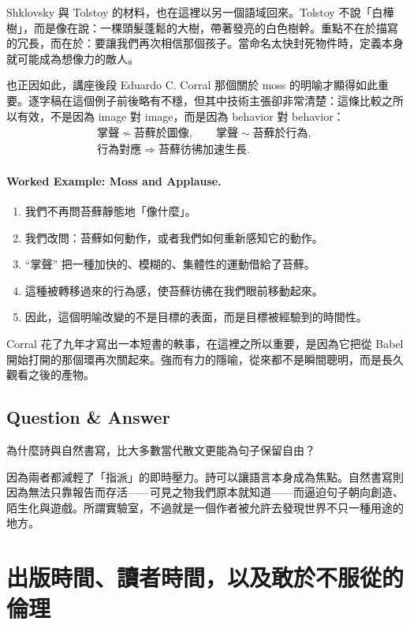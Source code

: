 Shklovsky 與 Tolstoy 的材料，也在這裡以另一個語域回來。Tolstoy 不說「白樺樹」，而是像在說：一棵頭髮蓬鬆的大樹，帶著發亮的白色樹幹。重點不在於描寫的冗長，而在於：要讓我們再次相信那個孩子。當命名太快封死物件時，定義本身就可能成為想像力的敵人。

也正因如此，講座後段 Eduardo C. Corral 那個關於 moss 的明喻才顯得如此重要。逐字稿在這個例子前後略有不穩，但其中技術主張卻非常清楚：這條比較之所以有效，不是因為 image 對 image，而是因為 behavior 對 behavior：
\begin{align}
\text{掌聲} \not\sim \text{苔蘚於圖像}, \qquad \text{掌聲} \sim \text{苔蘚於行為},\\
\text{行為對應} \Longrightarrow \text{苔蘚彷彿加速生長}.
\end{align}

\paragraph{Worked Example: Moss and Applause.}
\begin{enumerate}
\item 我們不再問苔蘚靜態地「像什麼」。
\item 我們改問：苔蘚如何動作，或者我們如何重新感知它的動作。
\item ``掌聲'' 把一種加快的、模糊的、集體性的運動借給了苔蘚。
\item 這種被轉移過來的行為感，使苔蘚彷彿在我們眼前移動起來。
\item 因此，這個明喻改變的不是目標的表面，而是目標被經驗到的時間性。
\end{enumerate}

Corral 花了九年才寫出一本短書的軼事，在這裡之所以重要，是因為它把從 Babel 開始打開的那個環再次關起來。強而有力的隱喻，從來都不是瞬間聰明，而是長久觀看之後的產物。

\subsection{Question \& Answer}

為什麼詩與自然書寫，比大多數當代散文更能為句子保留自由？

因為兩者都減輕了「指派」的即時壓力。詩可以讓語言本身成為焦點。自然書寫則因為無法只靠報告而存活——可見之物我們原本就知道——而逼迫句子朝向創造、陌生化與遊戲。所謂實驗室，不過就是一個作者被允許去發現世界不只一種用途的地方。

\section{出版時間、讀者時間，以及敢於不服從的倫理}

